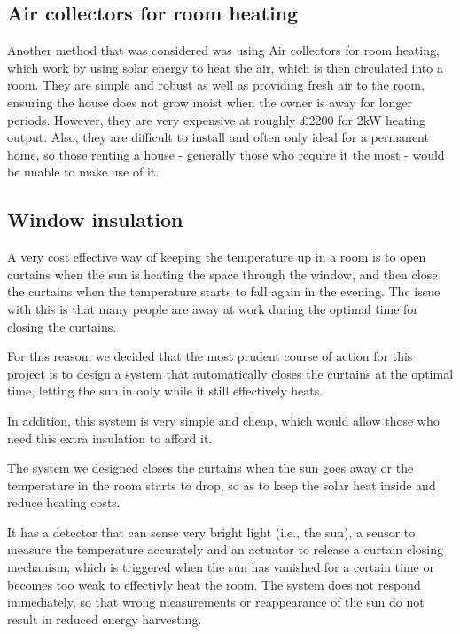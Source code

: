 \documentclass[a4paper,12pt]{article}
\begin{document}
\subsection{Air collectors for room heating}

Another method that was considered was using Air collectors for room heating, which work by using solar energy to heat the air, which is then circulated into a room. 
They are simple and robust as well as providing fresh air to the room, ensuring the house does not grow moist when the owner is away for longer periods. 
However, they are very expensive at roughly £2200 for 2kW heating output\cite{url:solarVenti}. Also, they are difficult to install and often only ideal for a permanent home, 
so those renting a house - generally those who require it the most - would be unable to make use of it.

\subsection{Window insulation}

A very cost effective way of keeping the temperature up in a room is to open curtains when the sun is heating the space through the window, 
and then close the curtains when the temperature starts to fall again in the evening. 
The issue with this is that many people are away at work during the optimal time for closing the curtains.

For this reason, we decided that the most prudent course of action for this project is to design a system that automatically closes the curtains at the optimal time, 
letting the sun in only while it still effectively heats. 

In addition, this system is very simple and cheap, which would allow those who need this extra insulation to afford it.

The system we designed closes the curtains when the sun goes away or the temperature in the room starts to drop, so as to keep the solar heat inside 
and reduce heating costs.

It has a detector that can sense very bright light (i.e., the sun), a sensor to measure the temperature accurately and an actuator to 
release a curtain closing mechanism, which is triggered when the sun has vanished for a certain time or becomes too weak to effectivly heat the room.
 The system does not respond immediately, so that wrong measurements or reappearance of the sun do not result in reduced energy harvesting.
\end{document}
